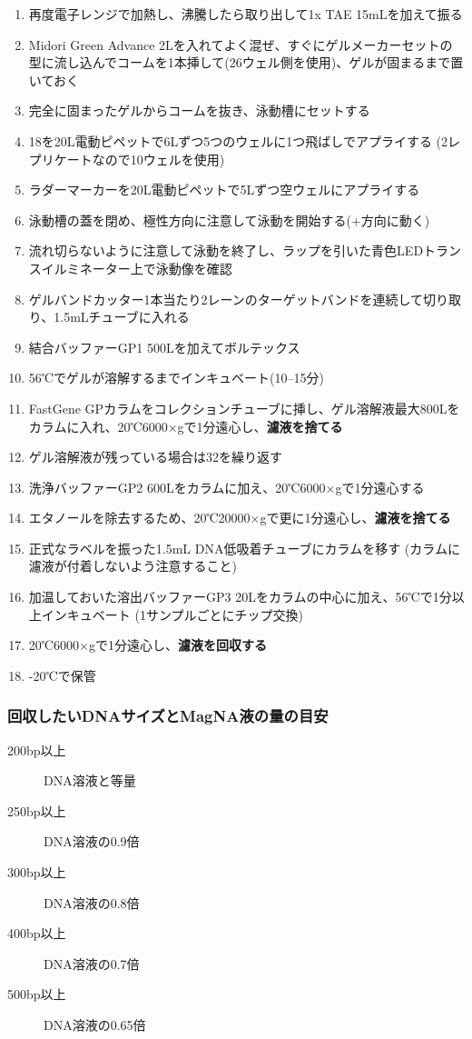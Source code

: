 \documentclass[titlepage,10pt,a4paper,uplatex]{jsbook}
\renewcommand{\textbf}[1]{{\bfseries\sffamily#1}}
\begin{document}
\begin{enumerate}
\item 再度電子レンジで加熱し、沸騰したら取り出して1x TAE 15mLを加えて振る
\item Midori Green Advance 2{\textmu}Lを入れてよく混ぜ、すぐにゲルメーカーセットの型に流し込んでコームを1本挿して(26ウェル側を使用)、ゲルが固まるまで置いておく
\item 完全に固まったゲルからコームを抜き、泳動槽にセットする
\item 18を20{\textmu}L電動ピペットで6{\textmu}Lずつ5つのウェルに1つ飛ばしでアプライする (2レプリケートなので10ウェルを使用)
\item ラダーマーカーを20{\textmu}L電動ピペットで5{\textmu}Lずつ空ウェルにアプライする
\item 泳動槽の蓋を閉め、極性方向に注意して泳動を開始する(+方向に動く)
\item 流れ切らないように注意して泳動を終了し、ラップを引いた青色LEDトランスイルミネーター上で泳動像を確認
\item ゲルバンドカッター1本当たり2レーンのターゲットバンドを連続して切り取り、1.5mLチューブに入れる
\item 結合バッファーGP1 500{\textmu}Lを加えてボルテックス
\item 56℃でゲルが溶解するまでインキュベート(10--15分)
\item FastGene GPカラムをコレクションチューブに挿し、ゲル溶解液最大800{\textmu}Lをカラムに入れ、20℃6000×gで1分遠心し、\textbf{濾液を捨てる}
\item ゲル溶解液が残っている場合は32を繰り返す
\item 洗浄バッファーGP2 600{\textmu}Lをカラムに加え、20℃6000×gで1分遠心する
\item エタノールを除去するため、20℃20000×gで更に1分遠心し、\textbf{濾液を捨てる}
\item 正式なラベルを振った1.5mL DNA低吸着チューブにカラムを移す (カラムに濾液が付着しないよう注意すること)
\item 加温しておいた溶出バッファーGP3 20{\textmu}Lをカラムの中心に加え、56℃で1分以上インキュベート (1サンプルごとにチップ交換)
\item 20℃6000×gで1分遠心し、\textbf{濾液を回収する}
\item -20℃で保管
\end{enumerate}

\subsubsection{回収したいDNAサイズとMagNA液の量の目安}
\begin{description}
\item[200bp以上] DNA溶液と等量
\item[250bp以上] DNA溶液の0.9倍
\item[300bp以上] DNA溶液の0.8倍
\item[400bp以上] DNA溶液の0.7倍
\item[500bp以上] DNA溶液の0.65倍
\end{description}
\end{document}
